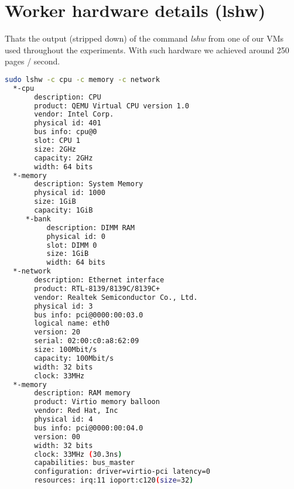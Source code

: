 
\chapter{Worker hardware details (lshw)} %
\label{appendix:worker} %

Thats the output (stripped down) of the command \emph{lshw} from one of our VMs used throughout the experiments. With such hardware we achieved around 250 pages / second.
\newline
\begin{lstlisting}[language=Bash]
sudo lshw -c cpu -c memory -c network
  *-cpu
       description: CPU
       product: QEMU Virtual CPU version 1.0
       vendor: Intel Corp.
       physical id: 401
       bus info: cpu@0
       slot: CPU 1
       size: 2GHz
       capacity: 2GHz
       width: 64 bits
  *-memory
       description: System Memory
       physical id: 1000
       size: 1GiB
       capacity: 1GiB
     *-bank
          description: DIMM RAM
          physical id: 0
          slot: DIMM 0
          size: 1GiB
          width: 64 bits
  *-network
       description: Ethernet interface
       product: RTL-8139/8139C/8139C+
       vendor: Realtek Semiconductor Co., Ltd.
       physical id: 3
       bus info: pci@0000:00:03.0
       logical name: eth0
       version: 20
       serial: 02:00:c0:a8:62:09
       size: 100Mbit/s
       capacity: 100Mbit/s
       width: 32 bits
       clock: 33MHz
  *-memory
       description: RAM memory
       product: Virtio memory balloon
       vendor: Red Hat, Inc
       physical id: 4
       bus info: pci@0000:00:04.0
       version: 00
       width: 32 bits
       clock: 33MHz (30.3ns)
       capabilities: bus_master
       configuration: driver=virtio-pci latency=0
       resources: irq:11 ioport:c120(size=32)
\end{lstlisting}